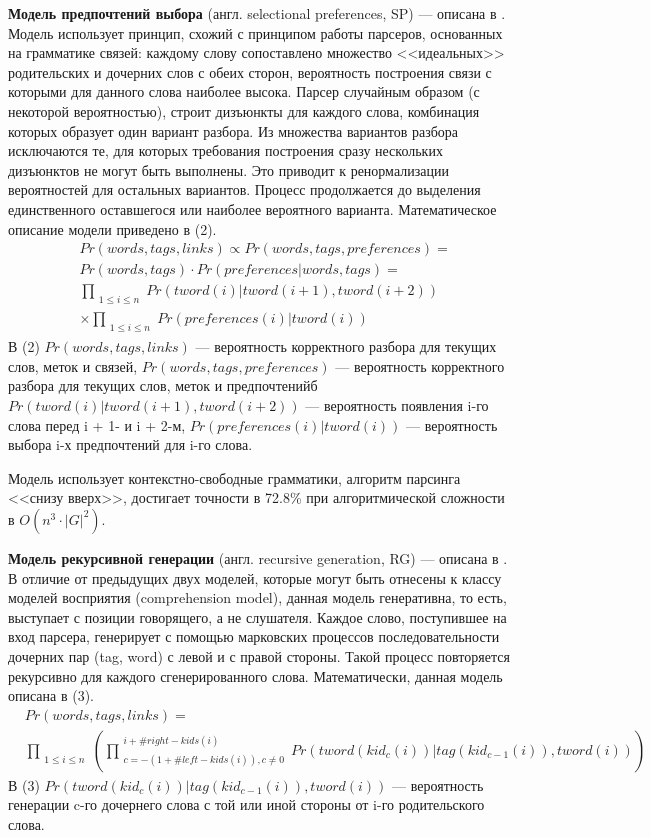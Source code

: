 \textbf{Модель предпочтений выбора} (англ. selectional preferences, SP) --- описана в \cite{eisner}. Модель использует принцип, схожий с принципом работы парсеров, основанных на грамматике связей: каждому слову сопоставлено множество <<идеальных>> родительских и дочерних слов с обеих сторон, вероятность построения связи с которыми для данного слова наиболее высока. Парсер случайным образом (с некоторой вероятностью), строит дизъюнкты для каждого слова, комбинация которых образует один вариант разбора. Из множества вариантов разбора исключаются те, для которых требования построения сразу нескольких дизъюнктов не могут быть выполнены. Это приводит к ренормализации вероятностей для остальных вариантов. Процесс продолжается до выделения единственного оставшегося или наиболее вероятного варианта. Математическое описание модели приведено в (2).
\begin{equation}\begin{split}
	& Pr(words, tags, links) \propto Pr(words, tags, preferences) = \\
	& Pr(words, tags) \cdot Pr(preferences | words, tags) = \\
	& \prod_{\substack{1 \leq i \leq n}} Pr(tword(i) | tword(i + 1), tword(i + 2)) \\
	& \times \prod_{\substack{1 \leq i \leq n}} Pr(preferences(i) | tword(i))
\end{split}\end{equation}
В (2) \(Pr(words, tags, links)\) --- вероятность корректного разбора для текущих слов, меток и связей, \(Pr(words, tags, preferences)\) --- вероятность корректного разбора для текущих слов, меток и предпочтенийб \(Pr(tword(i) | tword(i + 1), tword(i + 2))\) --- вероятность появления i-го слова перед i + 1- и i + 2-м, \(Pr(preferences(i) | tword(i))\) --- вероятность выбора i-х предпочтений для i-го слова.

Модель использует контекстно-свободные грамматики, алгоритм парсинга <<снизу вверх>>, достигает точности в 72.8\% при алгоритмической сложности в \(O(n^3 \cdot |G|^2)\).

\textbf{Модель рекурсивной генерации} (англ. recursive generation, RG) --- описана в \cite{eisner}. В отличие от предыдущих двух моделей, которые могут быть отнесены к классу моделей восприятия (comprehension model), данная модель генеративна, то есть, выступает с позиции говорящего, а не слушателя. Каждое слово, поступившее на вход парсера, генерирует с помощью марковских процессов последовательности дочерних пар (tag, word) с левой и с правой стороны. Такой процесс повторяется рекурсивно для каждого сгенерированного слова. Математически, данная модель описана в (3).
\begin{equation}\begin{split}
	& Pr(words, tags, links) = \\
	& \prod_{\substack{1 \leq i \leq n}} \left( \prod^{\substack{i + \#right-kids(i)}}_{\substack{c = - (1 + \#left-kids(i)), c \neq 0}} Pr(tword(kid_c(i)) | tag(kid_{c - 1}(i)), tword(i)) \right)
\end{split}\end{equation}
В (3) \(Pr(tword(kid_c(i)) | tag(kid_{c - 1}(i)), tword(i))\) --- вероятность генерации c-го дочернего слова с той или иной стороны от i-го родительского слова.

